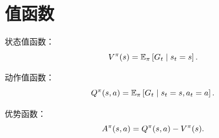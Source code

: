 \section{值函数}

状态值函数：
\[
  V^{\pi}(s)=\mathbb{E}_{\pi}\left[G_t\mid s_t=s\right].
\]

动作值函数：
\[
  Q^{\pi}(s,a)=\mathbb{E}_{\pi}\left[G_t\mid s_t=s,a_t=a\right].
\]

优势函数：
\[
  A^{\pi}(s,a)=Q^{\pi}(s,a)-V^{\pi}(s).
\]
